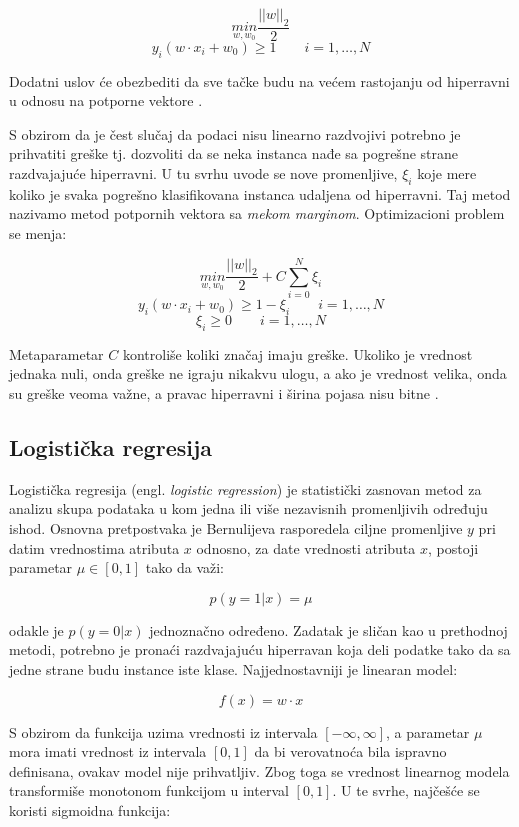 $$ \underset{w, w_0}{min} \dfrac{||w||_2}{2}$$
$$ y_i(w \cdot x_i + w_0) \geq 1 \qquad i=1, \ldots, N $$
 
Dodatni uslov će obezbediti da sve tačke budu na većem rastojanju od hiperravni u odnosu na potporne vektore \cite{ml}.

S obzirom da je čest slučaj da podaci nisu linearno razdvojivi potrebno je prihvatiti greške tj. dozvoliti da se neka instanca nađe sa pogrešne strane razdvajajuće hiperravni. U tu svrhu uvode se nove promenljive, $\xi_i$ koje mere koliko je svaka pogrešno klasifikovana instanca udaljena od hiperravni. Taj metod nazivamo metod potpornih vektora sa \textit{mekom marginom}. Optimizacioni problem se menja:

$$ \underset{w, w_0}{min} \dfrac{||w||_2}{2} + C\sum_{i=0}^{N} \xi_i$$
$$ y_i(w \cdot x_i + w_0) \geq 1 - \xi_i \qquad i=1, \ldots, N $$
$$ \xi_i \geq 0  \qquad i=1, \ldots, N $$
 
Metaparametar $C$ kontroliše koliki značaj imaju greške. Ukoliko je vrednost jednaka nuli, onda greške ne igraju nikakvu ulogu, a ako je vrednost velika, onda su greške veoma važne, a pravac hiperravni i širina pojasa nisu bitne \cite{ml}. 


\subsection{Logistička regresija}

Logistička regresija (engl. \textit{logistic regression}) je statistički zasnovan metod za analizu skupa podataka u kom jedna ili više nezavisnih promenljivih određuju ishod. Osnovna pretpostvaka je Bernulijeva rasporedela ciljne promenljive $y$ pri datim vrednostima atributa $x$ odnosno, za date vrednosti atributa $x$, postoji parametar $\mu \in [0, 1]$ tako da važi:

$$ p(y = 1 | x) = \mu $$ 

\noindent odakle je $ p(y=0 | x)$  jednoznačno određeno.
Zadatak je sličan kao u prethodnoj metodi, potrebno je pronaći razdvajajuću hiperravan koja deli podatke tako da sa jedne strane budu instance iste klase. Najjednostavniji je linearan model:

$$f(x) = w \cdot x$$

S obzirom da funkcija uzima vrednosti iz intervala $[-\infty, \infty]$, a parametar $\mu$ mora imati vrednost iz intervala $[0, 1]$ da bi verovatnoća bila ispravno definisana, ovakav model nije prihvatljiv. Zbog toga se vrednost linearnog modela transformiše monotonom funkcijom u interval $[0, 1]$. U te svrhe, najčešće se koristi sigmoidna funkcija:

